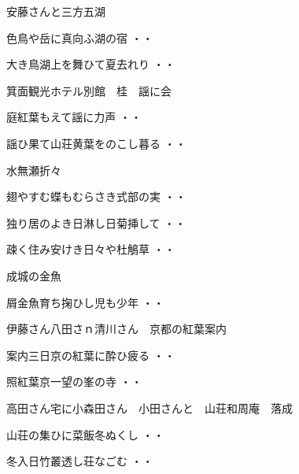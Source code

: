 \vspace{0.6cm}
安藤さんと三方五湖
\begin{shiika}色鳥や岳に真向ふ湖の宿
\hfill{・・}\end{shiika}
\begin{shiika}大き鳥湖上を舞ひて夏去れり
\hfill{・・}\end{shiika}
\vspace{0.6cm}
箕面観光ホテル別館　桂　謡に会
\begin{shiika}庭紅葉もえて謡に力声
\hfill{・・}\end{shiika}
\begin{shiika}謡ひ果て山荘黄葉をのこし暮る
\hfill{・・}\end{shiika}
\vspace{0.6cm}
水無瀬折々
\begin{shiika}翅やすむ蝶もむらさき式部の実
\hfill{・・}\end{shiika}
\begin{shiika}独り居のよき日淋し日菊挿して
\hfill{・・}\end{shiika}
\begin{shiika}疎く住み安けき日々や杜鵤草
\hfill{・・}\end{shiika}
\vspace{0.6cm}
成城の金魚
\begin{shiika}屑金魚育ち掬ひし児も少年
\hfill{・・}\end{shiika}
\vspace{0.6cm}
伊藤さん八田さｎ清川さん　京都の紅葉案内
\begin{shiika}案内三日京の紅葉に酔ひ疲る
\hfill{・・}\end{shiika}
\vspace{0.6cm}
\begin{shiika}照紅葉京一望の峯の寺
\hfill{・・}\end{shiika}
\vspace{0.6cm}
高田さん宅に小森田さん　小田さんと　山荘和周庵　落成
\begin{shiika}山荘の集ひに菜飯冬ぬくし
\hfill{・・}\end{shiika}
\begin{shiika}冬入日竹叢透し荘なごむ
\hfill{・・}\end{shiika}
